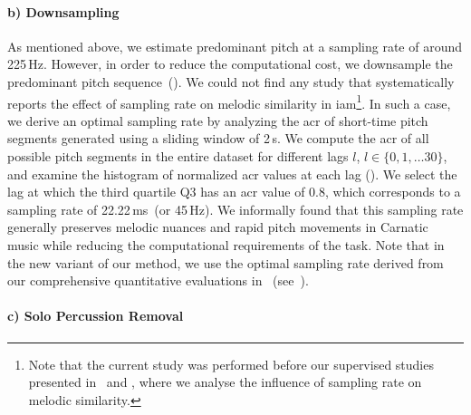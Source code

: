 \paragraph{b) Downsampling} 
As mentioned above, we estimate predominant pitch at a sampling rate of around 225\,Hz. However, in order to reduce the computational cost, we downsample the predominant pitch sequence~(). We could not find any study that systematically reports the effect of sampling rate on melodic similarity in \gls{iam}\footnote{Note that the current study was performed before our supervised studies presented in~ and , where we analyse the influence of sampling rate on melodic similarity.}. In such a case, we derive an optimal sampling rate by analyzing the \gls{acr} of short-time pitch segments generated using a sliding window of 2\,s. We compute the \gls{acr} of all possible pitch segments in the entire dataset for different lags $l$, $l\in \lbrace0,1,\dots30\rbrace$, and examine the histogram of normalized \gls{acr} values at each lag (). We select the lag at which the third quartile Q3 has an \gls{acr} value of 0.8, which corresponds to a sampling rate of 22.22\,ms~(or 45\,Hz). We informally found that this sampling rate generally preserves melodic nuances and rapid pitch movements in Carnatic music while reducing the computational requirements of the task. Note that in the new variant of our method, we use the optimal sampling rate derived from our comprehensive quantitative evaluations in~\cite{gulati_ICASSP2015} (see~). %




\paragraph{c) Solo Percussion Removal} 

